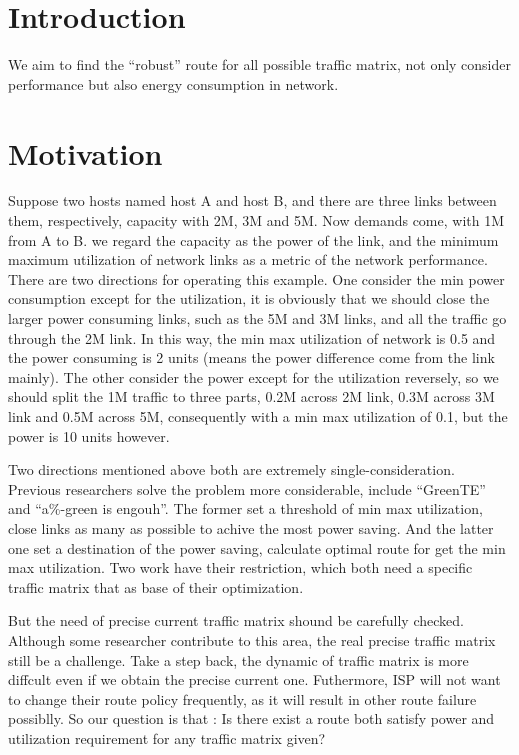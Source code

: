 \documentclass[conference]{IEEEtran}
\begin{document}
\IEEEpeerreviewmaketitle

\section{Introduction}
We aim to find the ``robust'' route for all possible traffic matrix, not only consider performance but also energy 
consumption in network.

\section{Motivation}
Suppose two hosts named host A and host B, and there are three links between 
them, respectively, capacity with 2M, 3M and 5M. Now demands come, with 1M from A to B. we regard the capacity 
as the power of the link, and the minimum maximum utilization of network links as a metric of the network performance. 
There are two directions for operating this example. One consider the min power consumption except for the 
utilization, it is obviously that we should close the larger power consuming links, such as the 5M and 3M links, and 
all the traffic go through the 2M link. In this way, the min max utilization of network is 0.5 and the power consuming 
is 2 units (means the power difference come from the link mainly). The other consider the power except for the 
utilization reversely, so we should split the 1M traffic to three parts, 0.2M across 2M link, 0.3M across 3M link and 
0.5M across 5M, consequently with a min max utilization of 0.1, but the power is 10 units however.

Two directions mentioned above both are extremely single-consideration. Previous researchers solve the problem more 
considerable, include ``GreenTE'' and ``a\%-green is engouh''. The former set a threshold of min max utilization, 
close links as many as possible to achive the most power saving. And the latter one set a destination of the power 
saving, calculate optimal route for get the min max utilization. Two work have their restriction, which both need a 
specific traffic matrix that as base of their optimization.

But the need of precise current traffic matrix shound be carefully checked. Although some researcher contribute to this 
area, the real precise traffic matrix still be a challenge. Take a step back, the dynamic of traffic matrix is more 
diffcult even if we obtain the precise current one. Futhermore, ISP will not want to change their route policy 
frequently, as it will result in other route failure possiblly. So our question is that : Is there exist a route both 
satisfy power and utilization requirement for any traffic matrix given?
\end{document}
